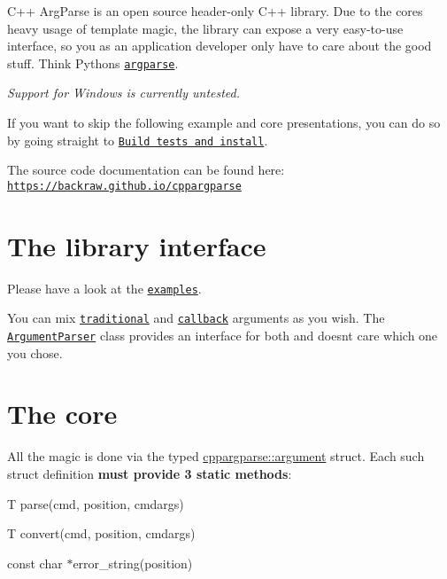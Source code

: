 C++ Arg\+Parse is an open source header-\/only C++ library. Due to the core\textquotesingle{}s heavy usage of template magic, the library can expose a very easy-\/to-\/use interface, so you as an application developer only have to care about the good stuff. Think Python\textquotesingle{}s \href{https://docs.python.org/3/library/argparse.html}{\tt argparse}.

\href{https://travis-ci.org/backraw/cppargparse}{\tt }

{\itshape Support for Windows is currently untested.}

If you want to skip the following example and core presentations, you can do so by going straight to \href{#Build-tests-and-install}{\tt Build tests and install}.

The source code documentation can be found here\+: \href{https://backraw.github.io/cppargparse}{\tt https\+://backraw.\+github.\+io/cppargparse}

\section*{The library interface}

Please have a look at the \href{https://github.com/backraw/cppargparse/tree/master/samples}{\tt examples}.

You can mix \href{https://github.com/backraw/cppargparse/tree/master/samples/traditional}{\tt traditional} and \href{https://github.com/backraw/cppargparse/tree/master/samples/callback}{\tt callback} arguments as you wish. The \href{https://github.com/backraw/cppargparse/blob/master/include/cppargparse/parser.h}{\tt Argument\+Parser} class provides an interface for both and doesn\textquotesingle{}t care which one you chose.

\section*{The core}

All the magic is done via the typed {\ttfamily \hyperlink{structcppargparse_1_1argument}{cppargparse\+::argument}} struct. Each such struct definition {\bfseries must provide 3 static methods}\+:
\begin{DoxyItemize}
\item {\ttfamily T parse(cmd, position, cmdargs)}
\item {\ttfamily T convert(cmd, position, cmdargs)}
\item {\ttfamily const char $\ast$error\+\_\+string(position)}
\end{DoxyItemize}

